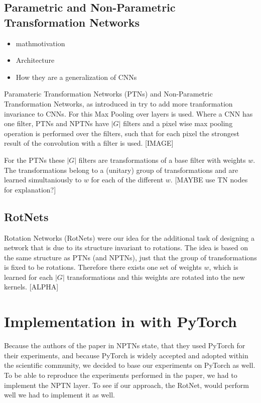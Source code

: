 \documentclass{llncs}
\begin{document}
\subsection{Parametric and Non-Parametric Transformation Networks}
\begin{itemize}
  \item	mathmotivation
  \item Architecture
  \item How they are a generalization of CNNs
\end{itemize}

Paramateric Transformation Networks (PTNs) and Non-Parametric Transformation Networks, as introduced in \cite{NPTN} try to add more tranformation invariance to CNNs. For this Max Pooling over layers is used. 
Where a CNN has one filter, PTNs and NPTNs have $|G|$ filters and a pixel wise max pooling operation is performed over the filters, such that for each pixel the strongest result of the convolution with a filter is used. [IMAGE]

For the PTNs these $|G|$ filters are transformations of a base filter with weights $w$. The transformations belong to a (unitary) group of transformations and are learned simultaniously to $w$ for each of the different $w$. [MAYBE use TN nodes for explanation?]



\subsection{RotNets}
Rotation Networks (RotNets) were our idea for the additional task of designing a network that is due to its structure invariant to rotations. 
The idea is based on the same structure as PTNs (and NPTNs), just that the group of transformations is fixed to be rotations. Therefore there exists one set of weights $w$, which is learned for each $|G|$ transformations and this weights are rotated into the new kernels. 
[ALPHA]

\section{Implementation in with PyTorch}
Because the authors of the paper in NPTNs state, that they used PyTorch for their experiments, and because PyTorch is widely accepted and adopted within the scientific community, we decided to base our experiments on PyTorch as well.
To be able to reproduce the experiments performed in the paper, we had to implement the NPTN layer. To see if our approach, the RotNet, would perform well we had to implement it as well.
\end{document}

